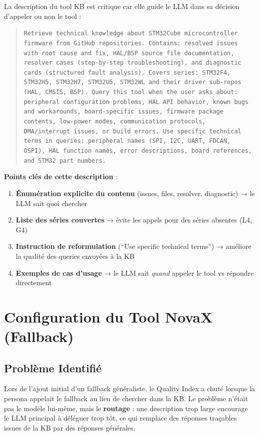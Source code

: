 La description du tool KB est critique car elle guide le LLM dans sa décision d'appeler ou non le tool :

\begin{quote}
\small\texttt{Retrieve technical knowledge about STM32Cube microcontroller firmware from GitHub repositories. Contains: resolved issues with root cause and fix, HAL/BSP source file documentation, resolver cases (step-by-step troubleshooting), and diagnostic cards (structured fault analysis). Covers series: STM32F4, STM32H5, STM32H7, STM32U5, STM32WL and their driver sub-repos (HAL, CMSIS, BSP). Query this tool when the user asks about: peripheral configuration problems, HAL API behavior, known bugs and workarounds, board-specific issues, firmware package contents, low-power modes, communication protocols, DMA/interrupt issues, or build errors. Use specific technical terms in queries: peripheral names (SPI, I2C, UART, FDCAN, OSPI), HAL function names, error descriptions, board references, and STM32 part numbers.}
\end{quote}

\textbf{Points clés de cette description} :
\begin{enumerate}
  \item \textbf{Énumération explicite du contenu} (issues, files, resolver, diagnostic) → le LLM sait quoi chercher
  \item \textbf{Liste des séries couvertes} → évite les appels pour des séries absentes (L4, G4)
  \item \textbf{Instruction de reformulation} (``Use specific technical terms'') → améliore la qualité des queries envoyées à la KB
  \item \textbf{Exemples de cas d'usage} → le LLM sait \textit{quand} appeler le tool vs répondre directement
\end{enumerate}

\section{Configuration du Tool NovaX (Fallback)}

\subsection{Problème Identifié}

Lors de l'ajout initial d'un fallback généraliste, le Quality Index a chuté lorsque la persona appelait le fallback au lieu de chercher dans la KB. Le problème n'était pas le modèle lui-même, mais le \textbf{routage} : une description trop large encourage le LLM principal à déléguer trop tôt, ce qui remplace des réponses traçables issues de la KB par des réponses générales.

